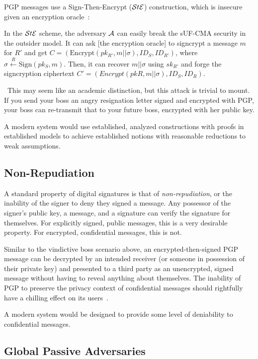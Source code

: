PGP messages use a Sign-Then-Encrypt ($\mathcal{S}t\mathcal{E}$) construction, which is insecure given an encryption
oracle~\cite[p. 41]{an2010}:

\begin{displayquote}
    In the $\mathcal{S}t\mathcal{E}$ scheme, the adversary $\mathcal{A}$ can easily break the sUF-CMA security in the outsider model.
    It can ask [the encryption oracle] to signcrypt a message $m$ for $R'$ and get
    $C=(\text{Encrypt}(pk_{R'},m||\sigma),ID_S,ID_{R'})$, where $\sigma \stackrel{R}{\gets} \text{Sign}(pk_S,m)$.
    Then, it can recover $m||\sigma$ using $sk_{R'}$ and forge the signcryption ciphertext
    $C' = (Encrypt(pkR,m||\sigma),ID_S,ID_R)$.
\end{displayquote}

~This may seem like an academic distinction, but this attack is trivial to mount.
If you send your boss an angry resignation letter signed and encrypted with PGP, your boss can re-transmit that to your
future boss, encrypted with her public key.

A modern system would use established, analyzed constructions with proofs in established models to achieve established
notions with reasonable reductions to weak assumptions.

\subsection{Non-Repudiation}\label{subsec:non-repudiation}

A standard property of digital signatures is that of \emph{non-repudiation}, or the inability of the signer to deny they
signed a message.
Any possessor of the signer's public key, a message, and a signature can verify the signature for themselves.
For explicitly signed, public messages, this is a very desirable property.
For encrypted, confidential messages, this is not.

Similar to the vindictive boss scenario above, an encrypted-then-signed PGP message can be decrypted by an intended
receiver (or someone in possession of their private key) and presented to a third party as an unencrypted, signed
message without having to reveal anything about themselves.
The inability of PGP to preserve the privacy context of confidential messages should rightfully have a chilling effect
on its users~\cite{borisov2004}.

A modern system would be designed to provide some level of deniability to confidential messages.

\subsection{Global Passive Adversaries}\label{subsec:global-passive-adversaries}

